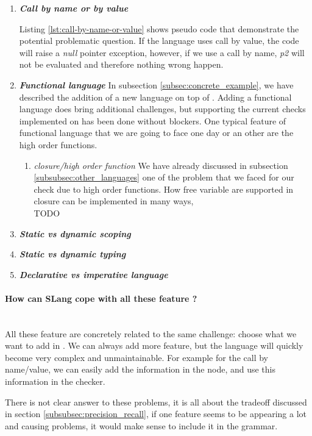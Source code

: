 \begin{enumerate}
	\item \textbf{\textit{Call by name or by value}} \newline
	
	
	Listing \ref{lst:call-by-name-or-value} shows pseudo code that demonstrate the potential problematic question. If the language uses call by value, the code will raise a \emph{null} pointer exception, however, if we use a call by name, \emph{p2} will not be evaluated and therefore nothing wrong happen. \newline
	\item \textbf{\textit{Functional language}} \newline
	In subsection \ref{subsec:concrete_example}, we have described the addition of a new language on top of \slang{}.
	Adding a functional language does bring additional challenges, but supporting the current checks implemented on \slang{} has been done without blockers. \newline
	One typical feature of functional language that we are going to face one day or an other are the high order functions.
	\begin{enumerate}
		\item \textit{closure/high order function} \newline
		We have already discussed in subsection \ref{subsubsec:other_languages} one of the problem that we faced for our check due to high order functions. 
		How free variable are supported in closure can be implemented in many ways, 
		\\
		TODO
		\\
	\end{enumerate}
	
	\item \textbf{\textit{Static vs dynamic scoping}} \newline
	\item \textbf{\textit{Static vs dynamic typing}} \newline
	\item \textbf{\textit{Declarative vs imperative language}} \newline
\end{enumerate}

\paragraph{How can SLang cope with all these feature ?}\mbox{}\\
\label{subsubsec:how_can_slang_cope_with_features}
All these feature are concretely related to the same challenge: choose what we want to add in \slang{}. 
We can always add more feature, but the language will quickly become very complex and unmaintainable. For example for the call by name/value, we can easily add the information in the node, and use this information in the checker.

There is not clear answer to these problems, it is all about the tradeoff discussed in section \ref{subsubsec:precision_recall}, if one feature seems to be appearing a lot and causing problems, it would make sense to include it in the grammar.



